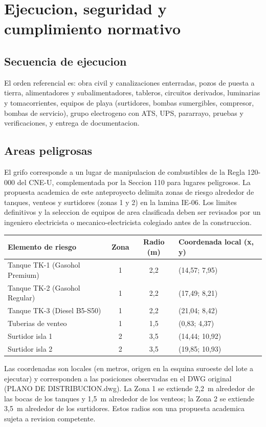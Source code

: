 \chapter{Ejecucion, seguridad y cumplimiento normativo}

\section{Secuencia de ejecucion}
El orden referencial es: obra civil y canalizaciones enterradas, pozos de
puesta a tierra, alimentadores y subalimentadores, tableros, circuitos
derivados, luminarias y tomacorrientes, equipos de playa (surtidores, bombas
sumergibles, compresor, bombas de servicio), grupo electrogeno con ATS, UPS,
pararrayo, pruebas y verificaciones, y entrega de documentacion.

\section{Areas peligrosas}
El grifo corresponde a un lugar de manipulacion de combustibles de la Regla
120-000 del CNE-U, complementada por la Seccion 110 para lugares peligrosos.
La propuesta academica de este anteproyecto delimita zonas de riesgo alrededor
de tanques, venteos y surtidores (zonas 1 y 2) en la lamina IE-06. Los limites
definitivos y la seleccion de equipos de area clasificada deben ser revisados
por un ingeniero electricista o mecanico-electricista colegiado antes de la
construccion.

\begin{center}
\small
\begin{tabularx}{\linewidth}{@{}l c c X@{}}
\toprule
Elemento de riesgo & Zona & Radio (m) & Coordenada local (x, y) \\
\midrule
Tanque TK-1 (Gasohol Premium) & 1 & 2,2 & (14,57; 7,95) \\
Tanque TK-2 (Gasohol Regular) & 1 & 2,2 & (17,49; 8,21) \\
Tanque TK-3 (Diesel B5-S50) & 1 & 2,2 & (21,04; 8,42) \\
Tuberias de venteo & 1 & 1,5 & (0,83; 4,37) \\
Surtidor isla 1 & 2 & 3,5 & (14,44; 10,92) \\
Surtidor isla 2 & 2 & 3,5 & (19,85; 10,93) \\
\bottomrule
\end{tabularx}
\end{center}

Las coordenadas son locales (en metros, origen en la esquina suroeste del lote
a ejecutar) y corresponden a las posiciones observadas en el DWG original
(PLANO DE DISTRIBUCION.dwg). La Zona 1 se extiende 2,2~m alrededor de las bocas
de los tanques y 1,5~m alrededor de los venteos; la Zona 2 se extiende 3,5~m
alrededor de los surtidores. Estos radios son una propuesta academica sujeta a
revision competente.

